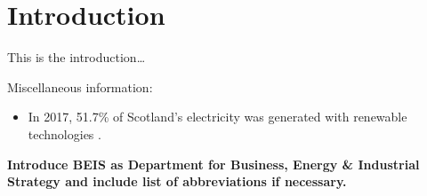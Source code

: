 
\section*{Introduction}

This is the introduction…


Miscellaneous information:
\begin{itemize}
	\item	In 2017, 51.7\% of Scotland's electricity was generated with renewable technologies \citep{BEIS2018}.
\end{itemize}

\textbf{Introduce BEIS as Department for Business, Energy {\&} Industrial Strategy and include list of abbreviations if necessary.}